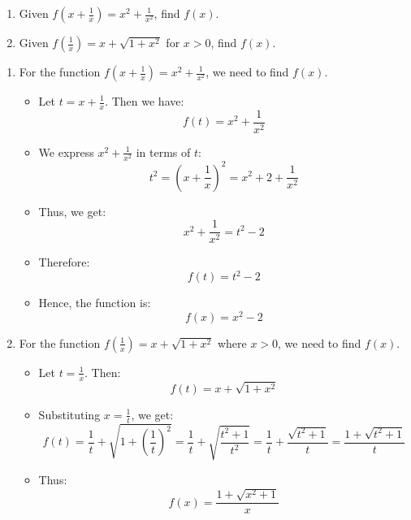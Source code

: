 \begin{exercise}
\begin{enumerate}
    \item Given \( f\left( x + \frac{1}{x} \right) = x^2 + \frac{1}{x^2} \), find \( f(x) \).
    \item Given \( f\left( \frac{1}{x} \right) = x + \sqrt{1 + x^2} \) for \( x > 0 \), find \( f(x) \).
\end{enumerate}
\end{exercise}
\begin{solution}
\begin{enumerate}
    \item For the function \( f\left( x + \frac{1}{x} \right) = x^2 + \frac{1}{x^2} \), we need to find \( f(x) \).
    \begin{itemize}
        \item Let \( t = x + \frac{1}{x} \). Then we have:
        \[
        f(t) = x^2 + \frac{1}{x^2}
        \]
        \item We express \( x^2 + \frac{1}{x^2} \) in terms of \( t \):
        \[
        t^2 = \left( x + \frac{1}{x} \right)^2 = x^2 + 2 + \frac{1}{x^2}
        \]
        \item Thus, we get:
        \[
        x^2 + \frac{1}{x^2} = t^2 - 2
        \]
        \item Therefore:
        \[
        f(t) = t^2 - 2
        \]
        \item Hence, the function is:
        \[
        f(x) = x^2 - 2
        \]
    \end{itemize}

    \item For the function \( f\left( \frac{1}{x} \right) = x + \sqrt{1 + x^2} \) where \( x > 0 \), we need to find \( f(x) \).
    \begin{itemize}
        \item Let \( t = \frac{1}{x} \). Then:
        \[
        f(t) = x + \sqrt{1 + x^2}
        \]
        \item Substituting \( x = \frac{1}{t} \), we get:
        \[
        f(t) = \frac{1}{t} + \sqrt{1 + \left( \frac{1}{t} \right)^2} = \frac{1}{t} + \sqrt{\frac{t^2 + 1}{t^2}} = \frac{1}{t} + \frac{\sqrt{t^2 + 1}}{t} = \frac{1 + \sqrt{t^2 + 1}}{t}
        \]
        \item Thus:
        \[
        f(x) = \frac{1 + \sqrt{x^2 + 1}}{x}
        \]
    \end{itemize}
\end{enumerate}
\end{solution}




